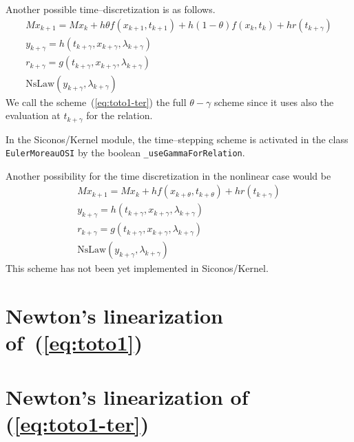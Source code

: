 Another possible time--discretization is as follows.
\begin{equation}
  \begin{array}{l}
    \label{eq:toto1-ter}
    M x_{k+1} = M x_{k} + h\theta f(x_{k+1},t_{k+1})+h(1-\theta) f(x_k,t_k) + h r(t_{k+\gamma}) \\[2mm]
    y_{k+\gamma} = h(t_{k+\gamma},x_{k+\gamma},\lambda _{k+\gamma}) \\[2mm]
    r_{k+\gamma} = g(t_{k+\gamma},x_{k+\gamma},\lambda _{k+\gamma})\\[2mm]
    \mbox{NsLaw} ( y_{k+\gamma} , \lambda_{k+\gamma})
  \end{array}
\end{equation}
We call the scheme~(\ref{eq:toto1-ter}) the full $\theta-\gamma$ scheme since it uses also the evaluation at $t_{k+\gamma}$ for the relation.

In the Siconos/Kernel module, the time--stepping scheme is activated in the class {\tt EulerMoreauOSI} by the boolean {\tt \_useGammaForRelation}.


Another possibility for the time discretization in the nonlinear case would be
\begin{equation}
  \begin{array}{l}
    \label{eq:toto1-quat}
    M x_{k+1} = M x_{k} +h f(x_{k+\theta},t_{k+\theta}) + h r(t_{k+\gamma}) \\[2mm]
    y_{k+\gamma} =  h(t_{k+\gamma},x_{k+\gamma},\lambda _{k+\gamma}) \\[2mm]
    r_{k+\gamma} = g(t_{k+\gamma},x_{k+\gamma},\lambda _{k+\gamma})\\[2mm]
    \mbox{NsLaw} ( y_{k+\gamma} , \lambda_{k+\gamma})
  \end{array}
\end{equation}
This scheme has not been yet implemented in Siconos/Kernel.

\clearpage
\section{Newton's linearization of~(\ref{eq:toto1})} 


%








\section{Newton's linearization of~ (\ref{eq:toto1-ter}) }




